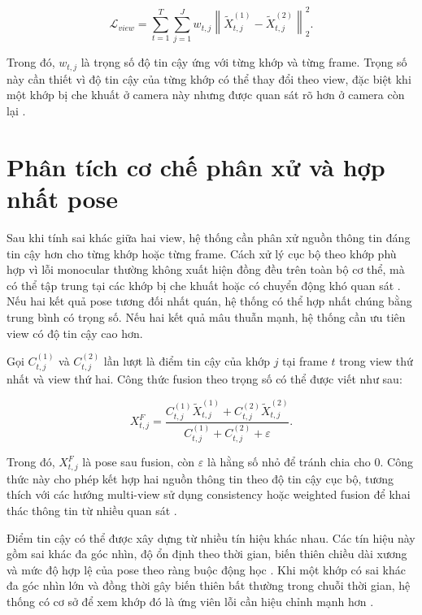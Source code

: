 \documentclass[../DoAn.tex]{subfiles}
\begin{document}
\begin{equation}
\mathcal{L}_{view}
=
\sum_{t=1}^{T}
\sum_{j=1}^{J}
w_{t,j}
\left\|
\tilde{X}^{(1)}_{t,j}
-
\tilde{X}^{(2)}_{t,j}
\right\|_2^2.
\end{equation}

Trong đó, $w_{t,j}$ là trọng số độ tin cậy ứng với từng khớp và từng frame. Trọng số này cần thiết vì độ tin cậy của từng khớp có thể thay đổi theo view, đặc biệt khi một khớp bị che khuất ở camera này nhưng được quan sát rõ hơn ở camera còn lại \cite{probtriangulation2023,gu2024multiview}.

\section{Phân tích cơ chế phân xử và hợp nhất pose}

Sau khi tính sai khác giữa hai view, hệ thống cần phân xử nguồn thông tin đáng tin cậy hơn cho từng khớp hoặc từng frame. Cách xử lý cục bộ theo khớp phù hợp vì lỗi monocular thường không xuất hiện đồng đều trên toàn bộ cơ thể, mà có thể tập trung tại các khớp bị che khuất hoặc có chuyển động khó quan sát \cite{smplify2016,physcap2020}. Nếu hai kết quả pose tương đối nhất quán, hệ thống có thể hợp nhất chúng bằng trung bình có trọng số. Nếu hai kết quả mâu thuẫn mạnh, hệ thống cần ưu tiên view có độ tin cậy cao hơn.

Gọi $C^{(1)}_{t,j}$ và $C^{(2)}_{t,j}$ lần lượt là điểm tin cậy của khớp $j$ tại frame $t$ trong view thứ nhất và view thứ hai. Công thức fusion theo trọng số có thể được viết như sau:

\begin{equation}
X^{F}_{t,j}
=
\frac{
C^{(1)}_{t,j}\tilde{X}^{(1)}_{t,j}
+
C^{(2)}_{t,j}\tilde{X}^{(2)}_{t,j}
}{
C^{(1)}_{t,j}
+
C^{(2)}_{t,j}
+
\varepsilon
}.
\end{equation}

Trong đó, $X^{F}_{t,j}$ là pose sau fusion, còn $\varepsilon$ là hằng số nhỏ để tránh chia cho $0$. Công thức này cho phép kết hợp hai nguồn thông tin theo độ tin cậy cục bộ, tương thích với các hướng multi-view sử dụng consistency hoặc weighted fusion để khai thác thông tin từ nhiều quan sát \cite{gu2024multiview,probtriangulation2023}.

Điểm tin cậy có thể được xây dựng từ nhiều tín hiệu khác nhau. Các tín hiệu này gồm sai khác đa góc nhìn, độ ổn định theo thời gian, biến thiên chiều dài xương và mức độ hợp lệ của pose theo ràng buộc động học \cite{physcap2020,delp2007opensim,uhlrich2023opencap}. Khi một khớp có sai khác đa góc nhìn lớn và đồng thời gây biến thiên bất thường trong chuỗi thời gian, hệ thống có cơ sở để xem khớp đó là ứng viên lỗi cần hiệu chỉnh mạnh hơn \cite{gu2024multiview,physcap2020}.
\end{document}

